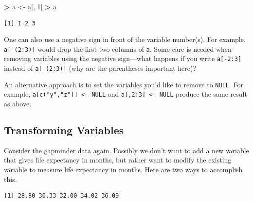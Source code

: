 \documentclass[]{krantz}
\makeatletter
\newenvironment{Shaded}{\begin{snugshade}}{\end{snugshade}}
\newcommand{\DecValTok}[1]{\textcolor[rgb]{0.06,0.06,0.06}{#1}}
\newcommand{\KeywordTok}[1]{\textcolor[rgb]{0.27,0.27,0.27}{\textbf{#1}}}
\newcommand{\NormalTok}[1]{#1}
\newcommand{\OperatorTok}[1]{\textcolor[rgb]{0.43,0.43,0.43}{\textbf{#1}}}
\newcommand{\StringTok}[1]{\textcolor[rgb]{0.5,0.5,0.5}{#1}}
\newenvironment{kframe}{%
\medskip{}
\setlength{\fboxsep}{.8em}
 \def\at@end@of@kframe{}%
 \ifinner\ifhmode%
  \def\at@end@of@kframe{\end{minipage}}%
  \begin{minipage}{\columnwidth}%
 \fi\fi%
 \def\FrameCommand##1{\hskip\@totalleftmargin \hskip-\fboxsep
 \colorbox{shadecolor}{##1}\hskip-\fboxsep
     \hskip-\linewidth \hskip-\@totalleftmargin \hskip\columnwidth}%
 \MakeFramed {\advance\hsize-\width
   \@totalleftmargin\z@ \linewidth\hsize
   \@setminipage}}%
 {\par\unskip\endMakeFramed%
 \at@end@of@kframe}
\renewenvironment{Shaded}{\begin{kframe}}{\end{kframe}}
\makeatother
\begin{document}
\begin{Shaded}
\begin{Highlighting}[]
\OperatorTok{>}\StringTok{ }\NormalTok{a <-}\StringTok{ }\NormalTok{a[, }\DecValTok{1}\NormalTok{]}
\OperatorTok{>}\StringTok{ }\NormalTok{a}
\end{Highlighting}
\end{Shaded}

\begin{verbatim}
[1] 1 2 3
\end{verbatim}

One can also use a negative sign in front of the variable number(s). For example, \texttt{a{[}-(2:3){]}} would drop the first two columns of \texttt{a}. Some care is needed when removing variables using the negative sign---what happens if you write \texttt{a{[}-2:3{]}} instead of \texttt{a{[}-(2:3){]}} (why are the parentheses important here)?

An alternative approach is to set the variables you'd like to remove to \texttt{NULL}. For example, \texttt{a{[}c("y","z"){]}\ \textless{}-\ NULL} and \texttt{a{[},2:3{]}\ \textless{}-\ NULL} produce the same result as above.

\hypertarget{transforming-variables}{%
\subsection{Transforming Variables}\label{transforming-variables}}

Consider the gapminder data again. Possibly we don't want to add a new variable that gives life expectancy in months, but rather want to modify the existing variable to measure life expectancy in months. Here are two ways to accomplish this.

\begin{Shaded}
\end{Shaded}

\begin{verbatim}
[1] 28.80 30.33 32.00 34.02 36.09
\end{verbatim}

\begin{Shaded}
\end{Shaded}
\end{document}
